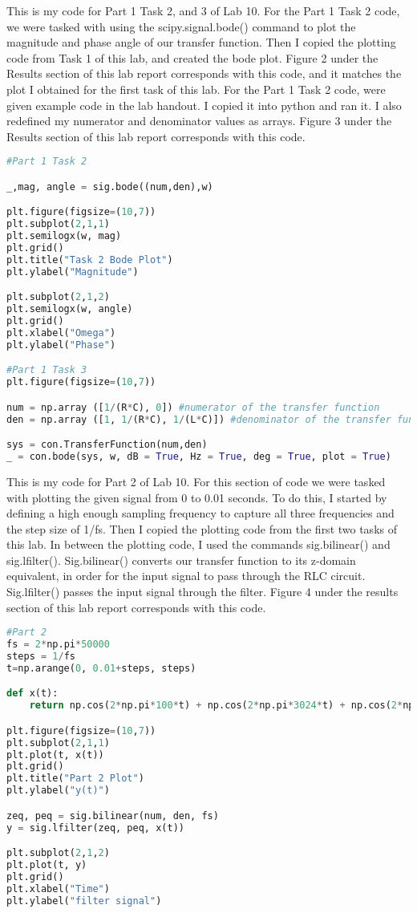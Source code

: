 \documentclass[12pt]{report}
\begin{document}
{This is my code for Part 1 Task 2, and 3 of Lab 10. For the Part 1 Task 2 code, we were tasked with using the scipy.signal.bode() command to plot the magnitude and phase angle of our transfer function. Then I copied the plotting code from Task 1 of this lab, and created the bode plot. Figure 2 under the Results section of this lab report corresponds with this code, and it matches the plot I obtained for the first task of this lab. For the Part 1 Task 2 code, were given example code in the lab handout. I copied it into python and ran it. I also redefined my numerator and denominator values as arrays. Figure 3 under the Results section of this lab report corresponds with this code. }
\begin{lstlisting}[language=Python]
#Part 1 Task 2

_,mag, angle = sig.bode((num,den),w)

plt.figure(figsize=(10,7))
plt.subplot(2,1,1)
plt.semilogx(w, mag)
plt.grid()
plt.title("Task 2 Bode Plot")
plt.ylabel("Magnitude")

plt.subplot(2,1,2)
plt.semilogx(w, angle)
plt.grid()
plt.xlabel("Omega")
plt.ylabel("Phase") 

#Part 1 Task 3
plt.figure(figsize=(10,7))

num = np.array ([1/(R*C), 0]) #numerator of the transfer function
den = np.array ([1, 1/(R*C), 1/(L*C)]) #denominator of the transfer function

sys = con.TransferFunction(num,den)
_ = con.bode(sys, w, dB = True, Hz = True, deg = True, plot = True) 
\end{lstlisting}

{This is my code for Part 2 of Lab 10. For this section of code we were tasked with plotting the given signal from 0 to 0.01 seconds. To do this, I started by defining a high enough sampling frequency to capture all three frequencies and the step size of 1/fs. Then I copied the plotting code from the first two tasks of this lab. In between the plotting code, I used the commands sig.bilinear() and sig.lfilter(). Sig.bilinear() converts our transfer function to its z-domain equivalent, in order for the input signal to pass through the RLC circuit. Sig.lfilter() passes the input signal through the filter. Figure 4 under the results section of this lab report corresponds with this code. }
\begin{lstlisting}[language=Python]
#Part 2
fs = 2*np.pi*50000
steps = 1/fs
t=np.arange(0, 0.01+steps, steps)

def x(t):
    return np.cos(2*np.pi*100*t) + np.cos(2*np.pi*3024*t) + np.cos(2*np.pi*50000*t)

plt.figure(figsize=(10,7))
plt.subplot(2,1,1)
plt.plot(t, x(t))
plt.grid()
plt.title("Part 2 Plot")
plt.ylabel("y(t)")

zeq, peq = sig.bilinear(num, den, fs)
y = sig.lfilter(zeq, peq, x(t))

plt.subplot(2,1,2)
plt.plot(t, y)
plt.grid()
plt.xlabel("Time")
plt.ylabel("filter signal") 
\end{lstlisting}
\end{document}
